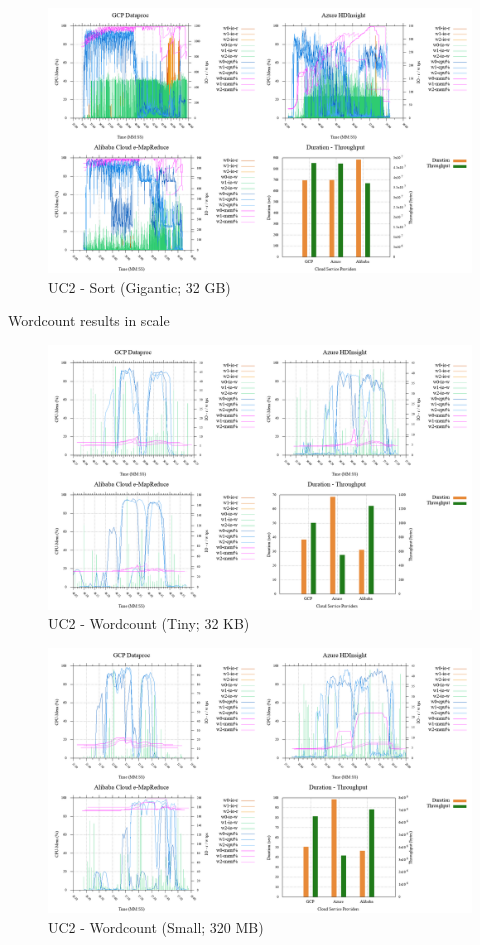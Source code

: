\documentclass[review]{elsarticle}
\begin{document}
\begin{figure}[b]
	\caption{UC2 - Sort (Gigantic; 32 GB)}
	\label{fig:uc2-srt-g-cmidt}
	\includegraphics[width=\textwidth]{uc2-srt-g-cmidt}
	\centering
\end{figure}

Wordcount results in scale

\begin{figure}[b]
	\caption{UC2 - Wordcount (Tiny; 32 KB)}
	\label{fig:uc2-wrdcnt-t-cmidt}
	\includegraphics[width=\textwidth]{uc2-wrdcnt-t-cmidt}
	\centering
\end{figure}

\begin{figure}[b]
	\caption{UC2 - Wordcount (Small; 320 MB)}
	\label{fig:uc2-wrdcnt-s-cmidt}
	\includegraphics[width=\textwidth]{uc2-wrdcnt-s-cmidt}
	\centering
\end{figure}
\end{document}
